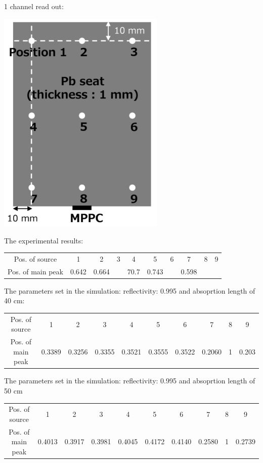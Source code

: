 \documentclass[12pt, a4paper,titlepage]{article}
\numberwithin{equation}{section}
\numberwithin{figure}{section}
\begin{document}
1 channel read out:

\includegraphics[width=80.0mm]{images/positions.png}

The experimental results:

\begin{center}
\begin{tabular}{ |c|c|c|c|c|c|c|c|c|c| } 
 \hline
  Pos. of source & 1 & 2 & 3 & 4 & 5 & 6 & 7 & 8 & 9 \\ 
  Pos. of main peak & 0.642 & 0.664 & & 70.7 & 0.743 & & 0.598 & &  \\ 
 \hline
\end{tabular}
\end{center}

The parameters set in the simulation: reflectivity: 0.995 and absoprtion length of
40 cm:

\begin{center}
\begin{tabular}{ |c|c|c|c|c|c|c|c|c|c| } 
 \hline
  Pos. of source & 1 & 2 & 3 & 4 & 5 & 6 & 7 & 8 & 9 \\ 
  Pos. of main peak & 0.3389 & 0.3256 & 0.3355 & 0.3521 & 0.3555 & 0.3522 & 0.2060 & 1 & 0.203  \\ 
 \hline
\end{tabular}
\end{center}


The parameters set in the simulation: reflectivity: 0.995 and absoprtion length of 50 cm

\begin{center}
\begin{tabular}{ |c|c|c|c|c|c|c|c|c|c| } 
 \hline
 Pos. of source & 1 & 2 & 3 & 4 & 5 & 6 & 7 & 8 & 9 \\ 
 Pos. of main peak & 0.4013 & 0.3917 & 0.3981 & 0.4045 & 0.4172 & 0.4140 & 0.2580 & 1 & 0.2739\\ 
 \hline
\end{tabular}
\end{center}
\end{document}
